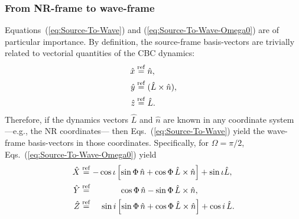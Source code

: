 \documentclass[11pt,tightenlines,article,amssymb,amsmath,amsfonts,superscriptaddress]{revtex4}
\newcommand{\nNR}{\hat{n}}
\newcommand{\lNR}{\hat L}
\newcommand{\ExS}{{{\hat x}}}
\newcommand{\EyS}{{{\hat y}}}
\newcommand{\EzS}{{{\hat z}}}
\newcommand{\ExW}{\hat X}
\newcommand{\EyW}{\hat Y}
\newcommand{\EzW}{\hat Z}
\newcommand{\phiRef}{\Phi} %
\newcommand{\equalref}{\overset{\rm ref}{=}}
\begin{document}
\subsubsection{From NR-frame to wave-frame}


Equations~(\ref{eq:Source-To-Wave}) and
(\ref{eq:Source-To-Wave-Omega0}) are of particular importance.  By
definition, the source-frame basis-vectors are trivially related to
vectorial quantities of the CBC dynamics:
\begin{subequations}
  \begin{align}
    \ExS&\equalref \nNR,\\
    \EyS&\equalref (\lNR\times\nNR),\\
    \EzS&\equalref \lNR.
  \end{align}
\end{subequations}
Therefore, if the dynamics vectors $\lNR$ and $\nNR$ are known in any
coordinate system ---e.g., the NR coordinates--- then
Eqs.~(\ref{eq:Source-To-Wave}) yield the wave-frame basis-vectors in those
coordinates.  Specifically, for $\Omega=\pi/2$,
Eqs.~(\ref{eq:Source-To-Wave-Omega0}) yield
\begin{subequations}
  \begin{align}
    \ExW &\equalref-\cos\iota\left[\sin\phiRef\,\nNR +\cos\phiRef\,\lNR\times\nNR\right]+\sin\iota\lNR,\\
    \EyW &\equalref \qquad\quad\;\,\cos\phiRef\,\nNR -\sin\phiRef\,\lNR\times\nNR,\\
\label{eq:Z}
    \EzW&\equalref\;\;\;\; \sin i\left[\sin\phiRef\,\nNR +\cos\phiRef\,\lNR\times\nNR\right]
    +\cos i\,\lNR.
  \end{align}
\end{subequations}
\end{document}
